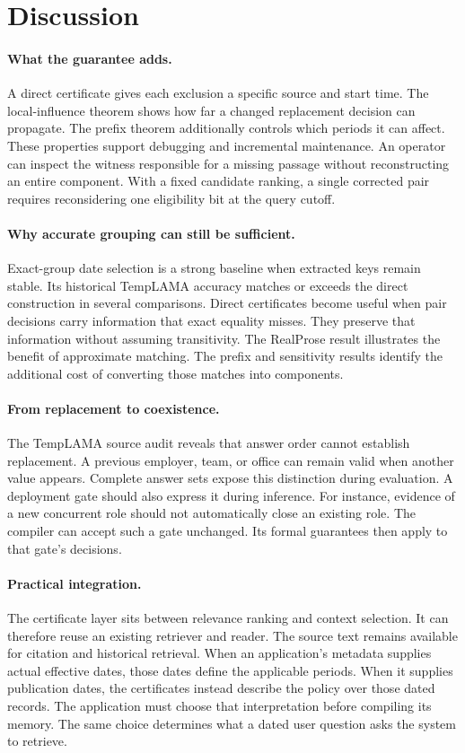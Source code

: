 \section{Discussion}
\label{sec:discussion}

\paragraph{What the guarantee adds.}
A direct certificate gives each exclusion a specific source and start time.
The local-influence theorem shows how far a changed replacement decision can propagate.
The prefix theorem additionally controls which periods it can affect.
These properties support debugging and incremental maintenance.
An operator can inspect the witness responsible for a missing passage without reconstructing an entire component.
With a fixed candidate ranking, a single corrected pair requires reconsidering one eligibility bit at the query cutoff.

\paragraph{Why accurate grouping can still be sufficient.}
Exact-group date selection is a strong baseline when extracted keys remain stable.
Its historical TempLAMA accuracy matches or exceeds the direct construction in several comparisons.
Direct certificates become useful when pair decisions carry information that exact equality misses.
They preserve that information without assuming transitivity.
The RealProse result illustrates the benefit of approximate matching.
The prefix and sensitivity results identify the additional cost of converting those matches into components.

\paragraph{From replacement to coexistence.}
The TempLAMA source audit reveals that answer order cannot establish replacement.
A previous employer, team, or office can remain valid when another value appears.
Complete answer sets expose this distinction during evaluation.
A deployment gate should also express it during inference.
For instance, evidence of a new concurrent role should not automatically close an existing role.
The compiler can accept such a gate unchanged.
Its formal guarantees then apply to that gate's decisions.

\paragraph{Practical integration.}
The certificate layer sits between relevance ranking and context selection.
It can therefore reuse an existing retriever and reader.
The source text remains available for citation and historical retrieval.
When an application's metadata supplies actual effective dates, those dates define the applicable periods.
When it supplies publication dates, the certificates instead describe the policy over those dated records.
The application must choose that interpretation before compiling its memory.
The same choice determines what a dated user question asks the system to retrieve.
